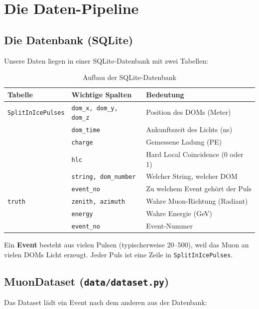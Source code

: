 \documentclass[12pt, a4paper]{article}
\begin{document}
\newpage
\section{Die Daten-Pipeline}

\subsection{Die Datenbank (SQLite)}

Unsere Daten liegen in einer SQLite-Datenbank mit zwei Tabellen:

\begin{table}[H]
\centering
\begin{tabular}{lll}
\toprule
\textbf{Tabelle} & \textbf{Wichtige Spalten} & \textbf{Bedeutung} \\
\midrule
\texttt{SplitInIcePulses} & \texttt{dom\_x, dom\_y, dom\_z} & Position des DOMs (Meter) \\
& \texttt{dom\_time} & Ankunftszeit des Lichts (ns) \\
& \texttt{charge} & Gemessene Ladung (PE) \\
& \texttt{hlc} & Hard Local Coincidence (0 oder 1) \\
& \texttt{string, dom\_number} & Welcher String, welcher DOM \\
& \texttt{event\_no} & Zu welchem Event geh\"ort der Puls \\
\midrule
\texttt{truth} & \texttt{zenith, azimuth} & Wahre Muon-Richtung (Radiant) \\
& \texttt{energy} & Wahre Energie (GeV) \\
& \texttt{event\_no} & Event-Nummer \\
\bottomrule
\end{tabular}
\caption{Aufbau der SQLite-Datenbank}
\end{table}

Ein \textbf{Event} besteht aus vielen Pulsen (typischerweise 20--500), weil
das Muon an vielen DOMs Licht erzeugt. Jeder Puls ist eine Zeile in
\texttt{SplitInIcePulses}.

\subsection{MuonDataset (\texttt{data/dataset.py})}

Das Dataset l\"adt ein Event nach dem anderen aus der Datenbank:
\end{document}
